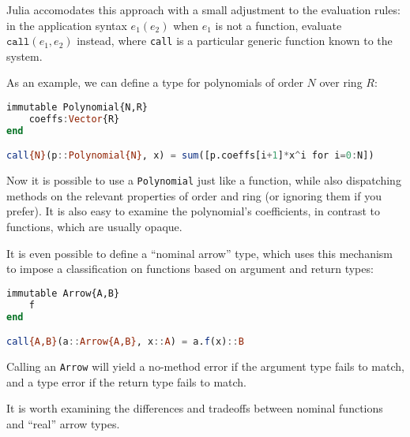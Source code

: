 Julia accomodates this approach with a small adjustment to the evaluation
rules: in the application syntax $e_1(e_2)$ when $e_1$ is not a function,
evaluate $\texttt{call}(e_1,e_2)$ instead, where \texttt{call} is
a particular generic function known to the system.

As an example, we can define a type for polynomials of order $N$ over ring
$R$:

\begin{singlespace}
\begin{lstlisting}[language=julia]
immutable Polynomial{N,R}
    coeffs:Vector{R}
end

call{N}(p::Polynomial{N}, x) = sum([p.coeffs[i+1]*x^i for i=0:N])
\end{lstlisting}
\end{singlespace}

\noindent
Now it is possible to use a \texttt{Polynomial} just like a function, while
also dispatching methods on the relevant properties of order and ring
(or ignoring them if you prefer).
It is also easy to examine the polynomial's coefficients, in contrast to
functions, which are usually opaque.


It is even possible to define a ``nominal arrow'' type, which uses this
mechanism to impose a classification on functions based on argument and
return types:

\begin{singlespace}
\begin{lstlisting}[language=julia]
immutable Arrow{A,B}
    f
end

call{A,B}(a::Arrow{A,B}, x::A) = a.f(x)::B
\end{lstlisting}
\end{singlespace}

\noindent
Calling an \texttt{Arrow} will yield a no-method error if the argument
type fails to match, and a type error if the return type fails to
match.

It is worth examining the differences and tradeoffs between nominal
functions and ``real'' arrow types.





